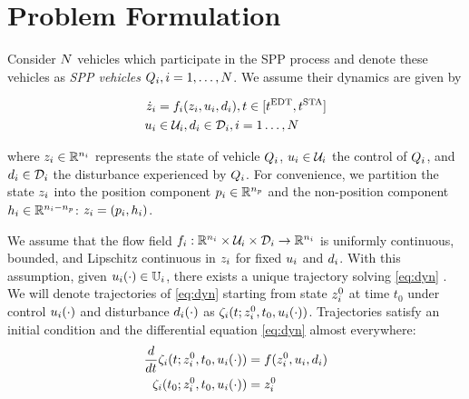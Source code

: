\section{Problem Formulation \label{sec:formulation}}
Consider $N$ vehicles which participate in the SPP process and denote these vehicles as \textit{SPP vehicles} $Q_i, i = 1, \ldots, N$. We assume their dynamics are given by

\begin{equation}
\label{eq:dyn}
\begin{aligned}
\dot\state_i &= \fdyn_i(\state_i, \ctrl_i, \dstb_i), t \in [\edt, \sta] \\
\ctrl_i &\in \cset_i, \dstb_i \in \dset_i, i = 1 \ldots, \N
\end{aligned}
\end{equation}

\noindent where $z_i \in \mathbb{R}^{n_i}$ represents the state of vehicle $Q_i$, $u_i \in \mathcal{U}_i$ the control of $Q_i$, and $d_i \in \mathcal{D}_i$ the disturbance experienced by $Q_i$. For convenience, we partition the state $z_i$ into the position component $p_i \in \mathbb{R}^{n_p}$ and the non-position component $h_i \in \mathbb{R}^{n_i - n_p}$: $z_i = (p_i, h_i)$.

We assume that the flow field $f_i: \mathbb{R}^{n_i}\times\mathcal{U}_i\times\mathcal{D}_i \rightarrow \mathbb{R}^{n_i}$ is uniformly continuous, bounded, and Lipschitz continuous in $z_i$ for fixed $u_i$ and $d_i$. With this assumption, given $u_i(\cdot) \in \mathbb{U}_i$, there exists a unique trajectory solving \eqref{eq:dyn} \cite{EarlA.Coddington1955}. We will denote trajectories of \eqref{eq:dyn} starting from state $z^0_i$ at time $t_0$ under control $u_i(\cdot)$ and disturbance $d_i(\cdot)$ as $\zeta_i(t; z^0_i, t_0, u_i(\cdot))$. Trajectories satisfy an initial condition and the differential equation \eqref{eq:dyn} almost everywhere:
\begin{equation}
\begin{aligned}
\frac{d}{dt}\zeta_i(t; z^0_i, t_0, u_i(\cdot)) &= f(z^0_i, u_i, d_i) \\
\zeta_i(t_0; z^0_i, t_0, u_i(\cdot)) &= z^0_i
\end{aligned}
\end{equation}

